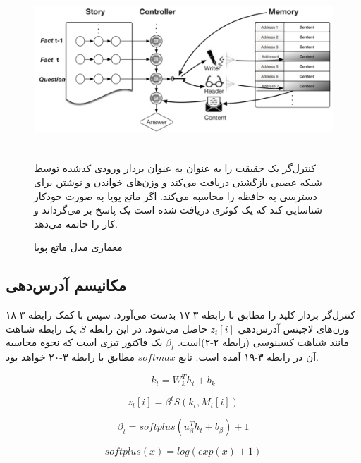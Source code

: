 \begin{figure}[!h]
\begin{center}
\includegraphics[height=6cm]{DNTM.png}
\end{center}
\caption{معماری مدل ماتع پویا\cite{gulcehre2018dynamic}}
\medskip
\small
کنترل‌گر یک حقیقت را به عنوان به عنوان بردار ورودی کدشده توسط شبکه عصبی بازگشتی دریافت می‌کند و وزن‌های خواندن و نوشتن برای دسترسی به حافظه را محاسبه می‌کند. اگر ماتع پویا به صورت خودکار شناسایی کند که یک کوئری دریافت شده است یک پاسخ بر می‌گرداند و کار را خاتمه می‌دهد.\cite{gulcehre2018dynamic}
\end{figure}

\subsection{مکانیسم آدرس‌دهی}
کنترل‌گر بردار کلید را مطابق با رابطه ۳-۱۷ بدست می‌آورد. سپس با کمک رابطه ۳-۱۸ وزن‌های لاجیتس آدرس‌دهی $z_t[i]$ حاصل می‌شود. در این رابطه $S$‌ یک رابطه شباهت مانند شباهت کسینوسی (رابطه ۲-۲)است. $\beta_t$ یک فاکتور تیزی است که نحوه محاسبه آن در رابطه ۳-۱۹ آمده است. تابع $softmax$ مطابق با رابطه ۳-۲۰ خواهد بود.\cite{gulcehre2018dynamic} 

\begin{equation}
k_t = W_k^Th_t + b_k
\end{equation}

\begin{equation}
z_t[i] = \beta^tS(k_t, M_t[i])
\end{equation}

\begin{equation}
\beta_t = softplus(u_{\beta}^Th_t + b_{\beta}) + 1
\end{equation}

\begin{equation}
softplus(x) = log(exp(x)+1)
\end{equation}

